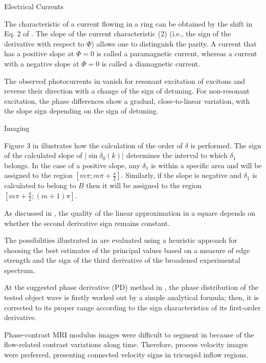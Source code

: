 \documentclass[11pt]{book}
\begin{document}

Electrical Currents

The characteristic of a current flowing in a ring can be obtained
by the shift in Eq. 2 of \cite{dajka2004persistent}. The slope of
the current characteristic (2) (i.e., the sign of the derivative with
respect to $\Phi$) allows one to distinguish the parity. A current
that has a positive slope at $\Phi=0$ is called a paramagnetic current,
whereas a current with a negative slope at $\Phi=0$ is called a diamagnetic
current.

The observed photocurrents in \cite{priyadarshi2013all} vanish for
resonant excitation of excitons and reverse their direction with a
change of the sign of detuning. For non-resonant excitation, the phase
differences show a gradual, close-to-linear variation, with the slope
sign depending on the sign of detuning.


Imaging

Figure 3 in \cite{geday2000images} illustrates how the calculation
of the order of $\delta$ is performed. The sign of the calculated
slope of $\left|\sin\delta_{0}\left(k\right)\right|$ determines the
interval to which $\delta_{1}$ belongs. In the case of a positive
slope, any $\delta_{1}$ is within a specific area and will be assigned
to the region $\left[m\pi;m\pi+\frac{\pi}{2}\right]$. Similarly,
if the slope is negative and $\delta_{1}$ is calculated to belong
to $B$ then it will be assigned to the region $\left[m\pi+\frac{\pi}{2};\left(m+1\right)\pi\right]$.

As discussed in \cite{yang2005approach}, the quality of the linear
approximation in a square depends on whether the second derivative
sign remains constant.

The possibilities illustrated in \cite{denny2007computing} are evaluated
using a heuristic approach for choosing the best estimates of the
principal values based on a measure of edge strength and the sign
of the third derivative of the broadened experimental spectrum.

At the suggested phase derivative (PD) method in \cite{guo2014phase},
the phase distribution of the tested object wave is firstly worked
out by a simple analytical formula; then, it is corrected to its proper
range according to the sign characteristics of its first-order derivative.

Phase-contrast MRI modulus images were difficult to segment in \cite{kachenoura2015right}
because of the flow-related contrast variations along time. Therefore,
process velocity images were preferred, presenting connected velocity
signs in tricuspid inflow regions.
\end{document}
